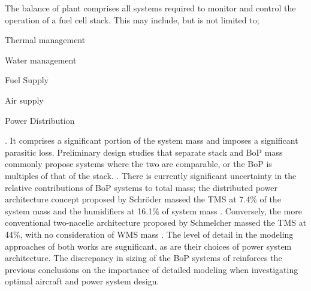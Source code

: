 The balance of plant comprises all systems required to monitor and control the operation of a fuel cell stack. This may include, but is not limited to; \begin{enumerate*}
	\item Thermal management
	\item Water management
	\item Fuel Supply
	\item Air supply
	\item Power Distribution
\end{enumerate*}. It comprises a significant portion of the system mass and imposes a significant parasitic loss. Preliminary design studies that separate stack and BoP mass commonly propose systems where the two are comparable, or the BoP is multiples of that of the stack. \cite{schroderOptimalDesignProton2024, parkRefinedSizingMethod2022, schmelcherHydrogenFuelCells2022a}.
There is currently significant uncertainty in the relative contributions of BoP systems to total mass;
the distributed power architecture concept proposed by Schr\"oder \etal massed the TMS at 7.4\% of the system mass and the humidifiers at 16.1\% of system mass \cite{schroderOptimalDesignProton2024}.
Conversely, the more conventional two-nacelle architecture proposed by Schmelcher massed the TMS at 44\%, with no consideration of WMS mass \cite{schmelcherHydrogenFuelCells2022a}.
The level of detail in the modeling approaches of both works are sugnificant, as are their choices of power system architecture.
The discrepancy in sizing of the BoP systems of reinforces the previous conclusions on the importance of detailed modeling when investigating optimal aircraft and power system design.
